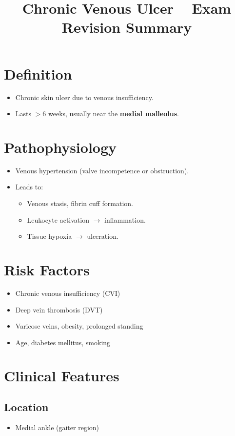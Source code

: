 \documentclass{article}
\title{Chronic Venous Ulcer -- Exam Revision Summary}
\author{}
\date{}
\begin{document}
\maketitle

\section*{Definition}
\begin{itemize}[noitemsep]
    \item Chronic skin ulcer due to venous insufficiency.
    \item Lasts $>$6 weeks, usually near the \textbf{medial malleolus}.
\end{itemize}

\section*{Pathophysiology}
\begin{itemize}[noitemsep]
    \item Venous hypertension (valve incompetence or obstruction).
    \item Leads to:
    \begin{itemize}
        \item Venous stasis, fibrin cuff formation.
        \item Leukocyte activation $\rightarrow$ inflammation.
        \item Tissue hypoxia $\rightarrow$ ulceration.
    \end{itemize}
\end{itemize}

\section*{Risk Factors}
\begin{itemize}[noitemsep]
    \item Chronic venous insufficiency (CVI)
    \item Deep vein thrombosis (DVT)
    \item Varicose veins, obesity, prolonged standing
    \item Age, diabetes mellitus, smoking
\end{itemize}

\section*{Clinical Features}
\subsection*{Location}
\begin{itemize}[noitemsep]
    \item Medial ankle (gaiter region)
\end{itemize}
\end{document}
